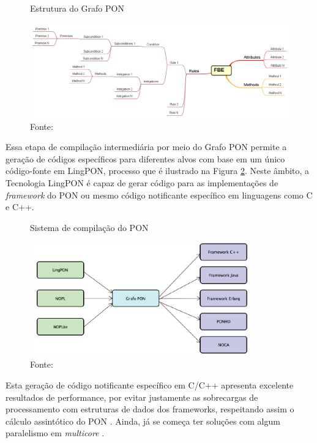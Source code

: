 \begin{figure}[!htb]
  \centering
  \caption{Estrutura do Grafo PON}
  \includegraphics[width=\textwidth]{../figures/grafo_pon_negrini.png}
  \smallskip
  \caption*{Fonte: }
  \label{fig:grafo_pon}
\end{figure}

\FloatBarrier

Essa etapa de compilação intermediária por meio do Grafo PON permite  a geração
de códigos específicos para diferentes alvos com base em um único código-fonte
em LingPON, processo que é ilustrado na Figura \ref{fig:sistema_compilacao}.
Neste âmbito, a Tecnologia LingPON é capaz de gerar código para as
implementações de \textit{framework} do PON ou mesmo código notificante
específico em linguagens como C e C++. 

\begin{figure}[!htb]
  \centering
  \caption{Sistema de compilação do PON}
  \includegraphics[width=0.85\textwidth]{../figures/sistema_compilacao.png}
  \smallskip
  \caption*{Fonte: }
  \label{fig:sistema_compilacao}
\end{figure}

Esta geração de código notificante específico em C/C++ apresenta excelente
resultados de performance, por evitar justamente as sobrecargas de processamento
com estruturas de dados dos frameworks, respeitando assim o cálculo assintótico
do PON \cite{ronszcka_2017,doc_ronszcka_2019,oshiro_2021}. Ainda, já se começa
ter soluções com algum paralelismo em \textit{multicore}
\cite{doc_ronszcka_2019,martini_2021}.

